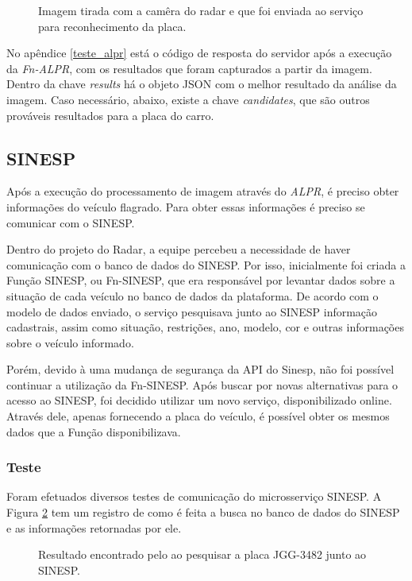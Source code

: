 \begin{figure}[H]
	\caption{\label{fig:teste-alpr-foto-carro} Imagem tirada com a camêra do radar e que foi enviada ao serviço para reconhecimento da placa.}
\end{figure}

No apêndice \ref{teste_alpr} está o código de resposta do servidor após a execução da \textit{Fn-ALPR}, com os resultados que foram capturados a partir da imagem. Dentro da chave \textit{results} há o objeto JSON com o melhor resultado da análise da imagem. Caso necessário, abaixo, existe a chave \textit{candidates}, que são outros prováveis resultados para a placa do carro.

\subsection{SINESP}

Após a execução do processamento de imagem através do \textit{ALPR}, é preciso obter informações do veículo flagrado. Para obter essas informações é preciso se comunicar com o SINESP.

Dentro do projeto do Radar, a equipe percebeu a necessidade de haver comunicação com o banco de dados do SINESP. Por isso, inicialmente foi criada a Função SINESP, ou Fn-SINESP, que era responsável por levantar dados sobre a situação de cada veículo no banco de dados da plataforma. De acordo com o modelo de dados enviado, o serviço pesquisava junto ao SINESP informação cadastrais, assim como situação, restrições, ano, modelo, cor e outras informações sobre o veículo informado.

Porém, devido à uma mudança de segurança da API do Sinesp, não foi possível continuar a utilização da Fn-SINESP. Após buscar por novas alternativas para o acesso ao SINESP, foi decidido utilizar um novo serviço, disponibilizado online. Através dele, apenas fornecendo a placa do veículo, é possível obter os mesmos dados que a Função disponibilizava.

\subsubsection{Teste}

Foram efetuados diversos testes de comunicação do microsserviço SINESP. A Figura \ref{fig:sinesp} tem um registro de como é feita a busca no banco de dados do SINESP e as informações retornadas por ele.

\begin{figure}[H]
	\caption{\label{fig:sinesp} Resultado encontrado pelo ao pesquisar a placa JGG-3482 junto ao SINESP.}
\end{figure}

